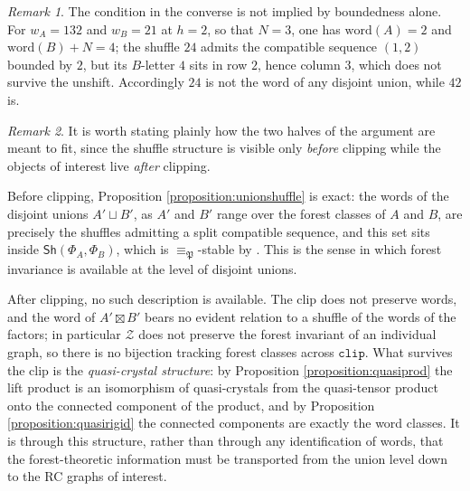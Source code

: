 \documentclass{amsart}
\theoremstyle{definition}
\theoremstyle{remark}
\newtheorem*{remark}{Remark}
\numberwithin{equation}{subsection}
\newcommand{\wof}[1]{w_{#1}}
\newcommand{\zeromap}{\mathcal{Z}}
\newcommand{\clp}{\mathtt{clip}}
\newcommand{\forest}{\mathfrak{P}}
\begin{document}
\begin{remark}
The condition in the converse is not implied by boundedness alone. For $\wof A=132$ and $\wof B=21$ at $h=2$, so that $N=3$, one has $\mathrm{word}(A)=2$ and $\mathrm{word}(B)+N=4$; the shuffle $24$ admits the compatible sequence $(1,2)$ bounded by $2$, but its $B$-letter $4$ sits in row $2$, hence column $3$, which does not survive the unshift. Accordingly $24$ is not the word of any disjoint union, while $42$ is.
\end{remark}

\begin{remark}\label{remark:shufflestrategy}
It is worth stating plainly how the two halves of the argument are meant to fit, since the shuffle structure is visible only \emph{before} clipping while the objects of interest live \emph{after} clipping.

Before clipping, Proposition \ref{proposition:unionshuffle} is exact: the words of the disjoint unions $A'\sqcup B'$, as $A'$ and $B'$ range over the forest classes of $A$ and $B$, are precisely the shuffles admitting a split compatible sequence, and this set sits inside $\mathsf{Sh}(\Phi_A,\Phi_B)$, which is $\equiv_\forest$-stable by \cite[Theorem~6.3]{nadeau2024forest}. This is the sense in which forest invariance is available at the level of disjoint unions.

After clipping, no such description is available. The clip does not preserve words, and the word of $A'\boxtimes B'$ bears no evident relation to a shuffle of the words of the factors; in particular $\zeromap$ does not preserve the forest invariant of an individual graph, so there is no bijection tracking forest classes across $\clp$. What survives the clip is the \emph{quasi-crystal structure}: by Proposition \ref{proposition:quasiprod} the lift product is an isomorphism of quasi-crystals from the quasi-tensor product onto the connected component of the product, and by Proposition \ref{proposition:quasirigid} the connected components are exactly the word classes. It is through this structure, rather than through any identification of words, that the forest-theoretic information must be transported from the union level down to the RC graphs of interest.
\end{remark}
\end{document}
